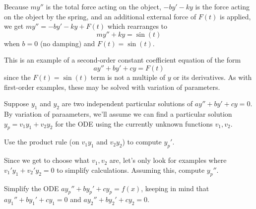 \begin{applicationActivities}
\begin{observation}
Because \(my''\) is the total force acting on the object,
\(-by'-ky\) is the force acting on the object by the spring,
and an additional external force of \(F(t)\) is applied,
we get \(my''=-by'-ky+F(t)\) which rearranges to
\[my''+ky=\sin(t)\]
when \(b=0\) (no damping) and \(F(t)=\sin(t)\).

\vfill

This is an example of a  second-order constant coefficient
equation of the form
\[
ay''+by'+cy=F(t)
\] 
since the \(F(t)=\sin(t)\) term is not a multiple of \(y\) or its derivatives.
As with first-order examples, these may be solved with variation of parameters.
\end{observation}

\begin{activity}{15}
Suppose \(y_1\) and \(y_2\) are two independent particular solutions of 
\(ay''+by'+cy=0\).  
\vfill
By variation of paraameters, we'll assume we can find a particular
solution \(y_p = v_1 y_1 + v_2 y_2\) for the ODE using
the currently unknown functions \(v_1,v_2\).
\vfill
\begin{subactivity}
Use the product rule (on \(v_1y_1\) and \(v_2y_2\)) to compute \(y_p'\).
\end{subactivity}

\begin{subactivity} 
Since we get to choose what \(v_1,v_2\) are, let's only look for examples
where \(v_1'y_1+v_2'y_2=0\) to simplify calculations.
Assuming this, compute \(y_p''\).
\end{subactivity}

\begin{subactivity}
Simplify the ODE \(ay_p''+by_p'+cy_p=f(x)\), keeping in mind that
\(ay_1''+by_1'+cy_1=0\) and \(ay_2''+by_2'+cy_2=0\).
\end{subactivity}
\vfill
\end{activity}

\end{applicationActivities}
